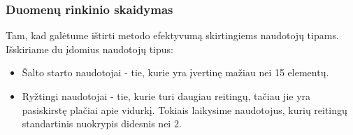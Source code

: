 \documentclass{VUMIFInfMagistrinis}
\begin{document}
\subsubsection{Duomenų rinkinio skaidymas}
\indent
Tam, kad galėtume ištirti metodo efektyvumą skirtingiems naudotojų tipams. Išskiriame du įdomius naudotojų tipus:
\begin{itemize}
	\item Šalto starto naudotojai - tie, kurie yra įvertinę mažiau nei 15 elementų.
	\item Ryžtingi naudotojai - tie, kurie turi daugiau reitingų, tačiau jie yra pasiskirstę plačiai apie vidurkį. Tokiais laikysime naudotojus, kurių reitingų standartinis nuokrypis didesnis nei $2$.
\end{itemize} 
\end{document}
